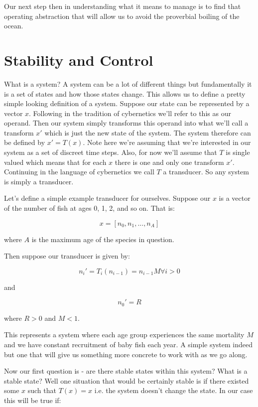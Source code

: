 \documentclass[11pt,a5paper]{article}
\begin{document}
Our next step then in understanding what it means to manage is to find that operating abstraction that will allow us to avoid the proverbial boiling of the ocean. 

\newpage



\section{Stability and Control}

What is a system? A system can be a lot of different things but fundamentally it is a set of states and how those states change. This allows us to define a pretty simple looking definition of a system. Suppose our state can be represented by a vector $x$. Following in the tradition of cybernetics\cite{cybernetics} we'll refer to this as our operand. Then our system simply transforms this operand into what we'll call a transform $x'$ which is just the new state of the system. The system therefore can be defined by $x'=T(x)$. Note here we're assuming that we're interested in our system as a set of discreet time steps. Also, for now we'll assume that $T$ is single valued which means that for each $x$ there is one and only one transform $x'$. Continuing in the language of cybernetics we call $T$ a transducer. So any system is simply a transducer. 

Let's define a simple example transducer for ourselves. Suppose our $x$ is a vector of the number of fish at ages 0, 1, 2, and so on. That is:

$$x=[n_0, n_1, ..., n_A]$$

where $A$ is the maximum age of the species in question.

Then suppose our transducer is given by:

$$n_i'=T_i(n_{i-1})=n_{i-1}M \forall i > 0$$

and 

$$n_0'=R$$

where $R > 0$ and $M < 1$.

This represents a system where each age group experiences the same mortality $M$ and we have constant recruitment of baby fish each year. A simple system indeed but one that will give us something more concrete to work with as we go along. \newline

Now our first question is - are there stable states within this system? What is a stable state? Well one situation that would be certainly stable is if there existed some $x$ such that $T(x)=x$ i.e. the system doesn't change the state. In our case this will be true if:
\end{document}
